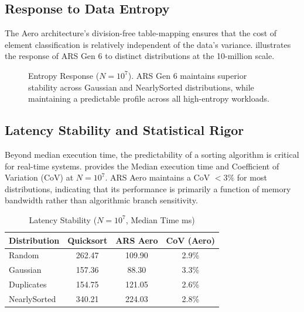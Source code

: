 \subsection{Response to Data Entropy}
The Aero architecture's division-free table-mapping ensures that the cost of element classification is relatively independent of the data's variance.  illustrates the response of ARS Gen 6 to distinct distributions at the 10-million scale.

\begin{figure}[htbp]
\centering
{}
\caption{Entropy Response ($N=10^7$). ARS Gen 6 maintains superior stability across Gaussian and NearlySorted distributions, while maintaining a predictable profile across all high-entropy workloads.}
\label{fig:entropy_response}
\end{figure}

\subsection{Latency Stability and Statistical Rigor}
Beyond median execution time, the predictability of a sorting algorithm is critical for real-time systems.  provides the Median execution time and Coefficient of Variation (CoV) at $N=10^7$. ARS Aero maintains a CoV $< 3\%$ for most distributions, indicating that its performance is primarily a function of memory bandwidth rather than algorithmic branch sensitivity.

\begin{table}[h]
\caption{Latency Stability ($N=10^7$, Median Time ms)}
\label{tab:latency_stability}
\centering
\begin{tabular}{lccc}
\toprule
Distribution & Quicksort & ARS Aero & CoV (Aero) \\
\midrule
Random & 262.47 & 109.90 & 2.9\% \\
Gaussian & 157.36 & 88.30 & 3.3\% \\
Duplicates & 154.75 & 121.05 & 2.6\% \\
NearlySorted & 340.21 & 224.03 & 2.8\% \\
\bottomrule
\end{tabular}
\end{table}
